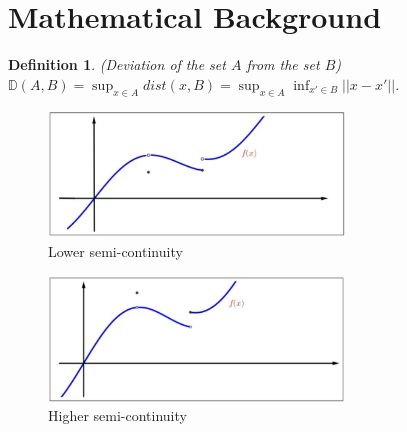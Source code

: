 \documentclass[a4pper,11pt]{article}
\newtheorem{defn}[thm]{Definition}
\begin{document}
\section{Mathematical Background}
\begin{defn}
	(Deviation of the set $A$ from the set $B$) $ \mathbb D(A,B) = \sup_{x\in A}dist(x,B) = \sup_{x\in A} \inf_{x'\in B}||x-x'||$.
\end{defn}

\begin{figure}[H] %
	\centering %
	\includegraphics[width=0.7\textwidth]{figs/lowersemi.png} %
	\caption{Lower semi-continuity} %
	\label{Fig.main2} %
\end{figure}
\begin{figure}[H] %
	\centering %
	\includegraphics[width=0.7\textwidth]{figs/highersemi.png} %
	\caption{Higher semi-continuity} %
	\label{Fig.main2} %
\end{figure}


\end{document}
